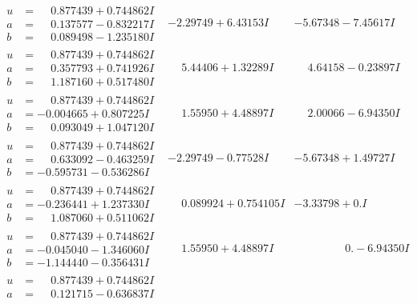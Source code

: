 \documentclass[1p]{elsarticle_modified}
\theoremstyle{definition}
\begin{document}
$$\begin{array}{c|c|c}
\begin{aligned}
u &= \phantom{-}0.877439 + 0.744862 I \\
a &= \phantom{-}0.137577 - 0.832217 I \\
b &= \phantom{-}0.089498 - 1.235180 I\end{aligned}
 & -2.29749 + 6.43153 I & -5.67348 - 7.45617 I \\ \hline\begin{aligned}
u &= \phantom{-}0.877439 + 0.744862 I \\
a &= \phantom{-}0.357793 + 0.741926 I \\
b &= \phantom{-}1.187160 + 0.517480 I\end{aligned}
 & \phantom{-}5.44406 + 1.32289 I & \phantom{-}4.64158 - 0.23897 I \\ \hline\begin{aligned}
u &= \phantom{-}0.877439 + 0.744862 I \\
a &= -0.004665 + 0.807225 I \\
b &= \phantom{-}0.093049 + 1.047120 I\end{aligned}
 & \phantom{-}1.55950 + 4.48897 I & \phantom{-}2.00066 - 6.94350 I \\ \hline\begin{aligned}
u &= \phantom{-}0.877439 + 0.744862 I \\
a &= \phantom{-}0.633092 - 0.463259 I \\
b &= -0.595731 - 0.536286 I\end{aligned}
 & -2.29749 - 0.77528 I & -5.67348 + 1.49727 I \\ \hline\begin{aligned}
u &= \phantom{-}0.877439 + 0.744862 I \\
a &= -0.236441 + 1.237330 I \\
b &= \phantom{-}1.087060 + 0.511062 I\end{aligned}
 & \phantom{-}0.089924 + 0.754105 I & -3.33798 + 0. I\phantom{ +0.000000I} \\ \hline\begin{aligned}
u &= \phantom{-}0.877439 + 0.744862 I \\
a &= -0.045040 - 1.346060 I \\
b &= -1.144440 - 0.356431 I\end{aligned}
 & \phantom{-}1.55950 + 4.48897 I & \phantom{-0.000000 } 0. - 6.94350 I \\ \hline\begin{aligned}
u &= \phantom{-}0.877439 + 0.744862 I \\
a &= \phantom{-}0.121715 - 0.636837 I \\

\end{aligned}
\end{array}$$
\end{document}
